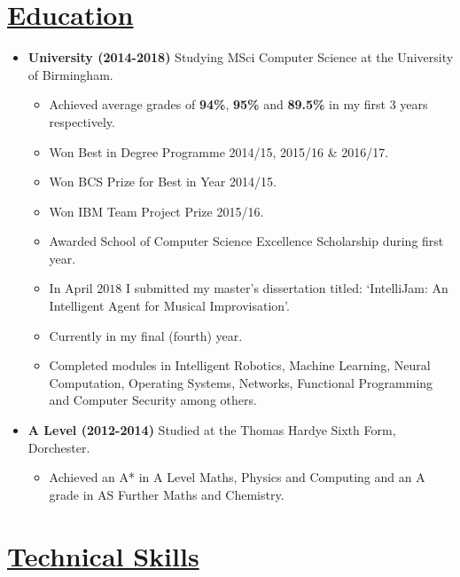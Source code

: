 \documentclass[11pt]{article}
\begin{document}
	\vspace{-30pt}
	\hspace{-100pt}\section*{\underline{Education}}
		\begin {itemize}
			\item \textbf{University (2014-2018)} Studying MSci Computer Science at the University of Birmingham.
				\begin{itemize}
					\item Achieved average grades of \textbf{94\%}, \textbf{95\%} and \textbf{89.5\%} in my first $3$ years respectively.
					\item Won Best in Degree Programme 2014/15, 2015/16 \& 2016/17.
					\item Won BCS Prize for Best in Year 2014/15.
					\item Won IBM Team Project Prize 2015/16.
					\item Awarded School of Computer Science Excellence Scholarship during first year.
					\item In April $2018$ I submitted my master's dissertation titled: `IntelliJam: An Intelligent Agent for Musical Improvisation'.
					\item Currently in my final (fourth) year.
					\item Completed modules in Intelligent Robotics, Machine Learning, Neural Computation, Operating Systems, Networks, Functional Programming and Computer Security among others.
				\end{itemize}
			\item \textbf{A Level (2012-2014)} Studied at the Thomas Hardye Sixth Form, Dorchester.
				\begin{itemize}
					\item Achieved an A* in A Level Maths, Physics and Computing and an A grade in AS Further Maths and Chemistry.
				\end{itemize}
			
		\end{itemize}
	\vspace{-20pt}
	\hspace{-100pt}\section*{\underline{Technical Skills}}
\end{document}
